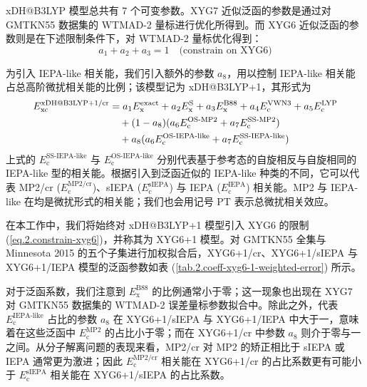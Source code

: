 xDH@B3LYP 模型总共有 7 个可变参数。XYG7 近似泛函的参数是通过对 GMTKN55 数据集的 WTMAD-2 量标进行优化所得到。而 XYG6 近似泛函的参数则是在下述限制条件下，对 WTMAD-2 量标优化得到：
\begin{equation}
  \label{eq.2.constrain-xyg6}
  a_1 + a_2 + a_3 = 1 \quad \text{(constrain on XYG6)}
\end{equation}

为引入 IEPA-like 相关能，我们引入额外的参数 $a_8$，用以控制 IEPA-like 相关能占总高阶微扰相关能的比例；该模型记为 xDH@B3LYP+1，其形式为
\begin{align}
  E_\mathrm{xc}^\text{xDH@B3LYP+1/cr} &= a_1 E_\mathrm{x}^\mathrm{exact} + a_2 E_\mathrm{x}^\mathrm{S} + a_3 E_\mathrm{x}^\mathrm{B88} + a_4 E_\mathrm{c}^\mathrm{VWN3} + a_5 E_\mathrm{c}^\mathrm{LYP} \notag \\
  &\quad + (1 - a_8) (a_6 E_\mathrm{c}^\text{OS-MP2} + a_7 E_\mathrm{c}^\text{SS-MP2}) \notag\\
  &\quad + a_8 (a_6 E_\mathrm{c}^\text{OS-IEPA-like} + a_7 E_\mathrm{c}^\text{SS-IEPA-like})
\end{align}
上式的 $E_\mathrm{c}^\text{SS-IEPA-like}$ 与 $E_\mathrm{c}^\text{OS-IEPA-like}$ 分别代表基于参考态的自旋相反与自旋相同的 IEPA-like 型的相关能。根据引入到泛函近似的 IEPA-like 种类的不同，它可以代表 MP2/cr ($E_\mathrm{c}^\mathrm{MP2/cr}$)、sIEPA ($E_\mathrm{c}^\mathrm{sIEPA}$) 与 IEPA ($E_\mathrm{c}^\mathrm{IEPA}$) 相关能。MP2 与 IEPA-like 在均是微扰形式的相关能；我们也会用记号 PT 表示总微扰相关效应。

在本工作中，我们将始终对 xDH@B3LYP+1 模型引入 XYG6 的限制 (\ref{eq.2.constrain-xyg6})，并称其为 XYG6+1 模型。对 GMTKN55 全集与 Minnesota 2015 的五个子集进行加权拟合后，XYG6+1/cr、XYG6+1/sIEPA 与 XYG6+1/IEPA 模型的泛函参数如表 (\ref{tab.2.coeff-xyg6-1-weighted-error}) 所示。

对于泛函系数，我们注意到 $E_\mathrm{x}^\mathrm{B88}$ 的比例通常小于零；这一现象也出现在 XYG7 对 GMTKN55 数据集的 WTMAD-2 误差量标参数拟合中。除此之外，代表 $E_\mathrm{c}^\text{IEPA-like}$ 占比的参数 $a_8$ 在 XYG6+1/sIEPA 与 XYG6+1/IEPA 中大于一，意味着在这些泛函中 $E_\mathrm{c}^\text{MP2}$ 的占比小于零；而在 XYG6+1/cr 中参数 $a_8$ 则介于零与一之间。从分子解离问题的表现来看，MP2/cr 对 MP2 的矫正相比于 sIEPA 或 IEPA 通常更为激进；因此 $E_\mathrm{c}^\text{MP2/cr}$ 相关能在 XYG6+1/cr 的占比系数更有可能小于 $E_\mathrm{c}^\text{sIEPA}$ 相关能在 XYG6+1/sIEPA 的占比系数。

